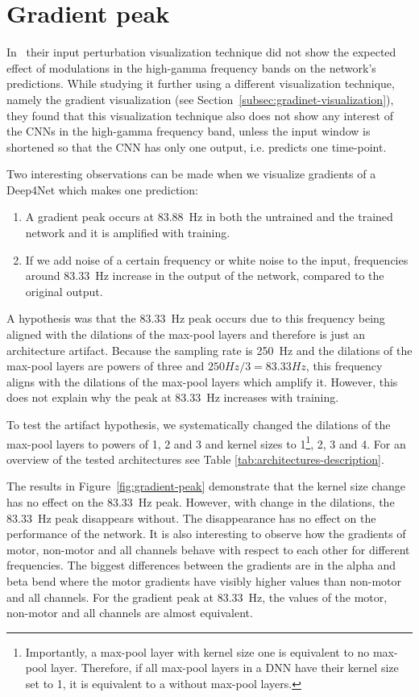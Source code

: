 \section{Gradient peak}\label{sec:gradient-peak}
In~\cite{Hammer-2021} their input perturbation visualization technique did not show the expected effect of modulations in the high-gamma frequency bands on the network's predictions.
While studying it further using a different visualization technique, namely the gradient visualization (see Section~\ref{subsec:gradinet-visualization}), they found that this visualization technique also does not show any interest of the CNNs in the high-gamma frequency band, unless the input window is shortened so that the CNN has only one output, i.e. predicts one time-point.

Two interesting observations can be made when we visualize gradients of a Deep4Net which makes one prediction:
\begin{enumerate}
\item A gradient peak occurs at 83.88~Hz in both the untrained and the trained network and it is amplified with training.
\item If we add noise of a certain frequency or white noise to the input, frequencies around 83.33~Hz increase in the output of the network, compared to the original output.
\end{enumerate}

A hypothesis was that the 83.33~Hz peak occurs due to this frequency being aligned with the dilations of the max-pool layers and therefore is just an architecture artifact.
Because the sampling rate is 250~Hz and the dilations of the max-pool layers are powers of three and $250 Hz / 3 = 83.33 Hz$, this frequency aligns with the dilations of the max-pool layers which amplify it.
However, this does not explain why the peak at 83.33~Hz increases with training.

To test the artifact hypothesis, we systematically changed the dilations of the max-pool layers to powers of 1, 2 and 3 and kernel sizes to 1\footnote{Importantly, a max-pool layer with kernel size one is equivalent to no max-pool layer. Therefore, if all max-pool layers in a DNN have their kernel size set to 1, it is equivalent to a  without max-pool layers.}, 2, 3 and 4. For an overview of the tested architectures see Table \ref{tab:architectures-description}.

The results in Figure~\ref{fig:gradient-peak} demonstrate that the kernel size change has no effect on the 83.33~Hz peak.
However, with change in the dilations, the 83.33~Hz peak disappears without.
The disappearance has no effect on the performance of the network. 
It is also interesting to observe how the gradients of motor, non-motor and all channels behave with respect to each other for different frequencies.
The biggest differences between the gradients are in the alpha and beta bend where the motor gradients have visibly higher values than non-motor and all channels.
For the gradient peak at 83.33~Hz, the values of the motor, non-motor and all channels are almost equivalent. \\

